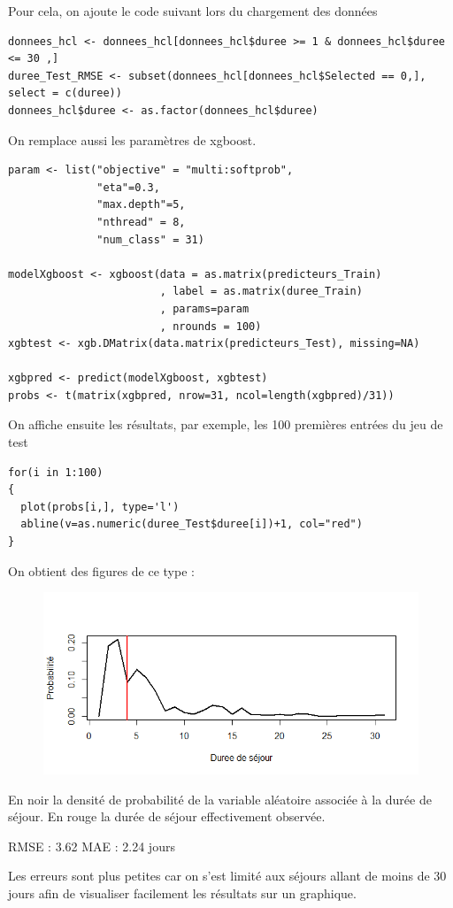 \documentclass[a4paper,11pt]{article}
\begin{document}
Pour cela, on ajoute le code suivant lors du chargement des données

\begin{lstlisting}
donnees_hcl <- donnees_hcl[donnees_hcl$duree >= 1 & donnees_hcl$duree <= 30 ,]
duree_Test_RMSE <- subset(donnees_hcl[donnees_hcl$Selected == 0,], select = c(duree))
donnees_hcl$duree <- as.factor(donnees_hcl$duree)
\end{lstlisting}

On remplace aussi les paramètres de xgboost.

\begin{lstlisting}
param <- list("objective" = "multi:softprob",
              "eta"=0.3,
              "max.depth"=5,
              "nthread" = 8,
              "num_class" = 31)

modelXgboost <- xgboost(data = as.matrix(predicteurs_Train)
                        , label = as.matrix(duree_Train)
                        , params=param
                        , nrounds = 100)
xgbtest <- xgb.DMatrix(data.matrix(predicteurs_Test), missing=NA)

xgbpred <- predict(modelXgboost, xgbtest)
probs <- t(matrix(xgbpred, nrow=31, ncol=length(xgbpred)/31))
\end{lstlisting}

On affiche ensuite les résultats, par exemple, les 100 premières entrées du jeu de test

\begin{lstlisting}
for(i in 1:100)
{
  plot(probs[i,], type='l')
  abline(v=as.numeric(duree_Test$duree[i])+1, col="red")
}
\end{lstlisting}
On obtient des figures de ce type :

\begin{figure}[H]
\begin{center}
\includegraphics [width=12cm]{Densite.png}
\end{center}
\end{figure}

En noir la densité de probabilité de la variable aléatoire associée à la durée de séjour. En rouge la durée de séjour effectivement observée.

RMSE : 3.62
MAE : 2.24 jours

Les erreurs sont plus petites car on s'est limité aux séjours allant de moins de 30 jours afin de visualiser facilement les résultats sur un graphique.
\end{document}
